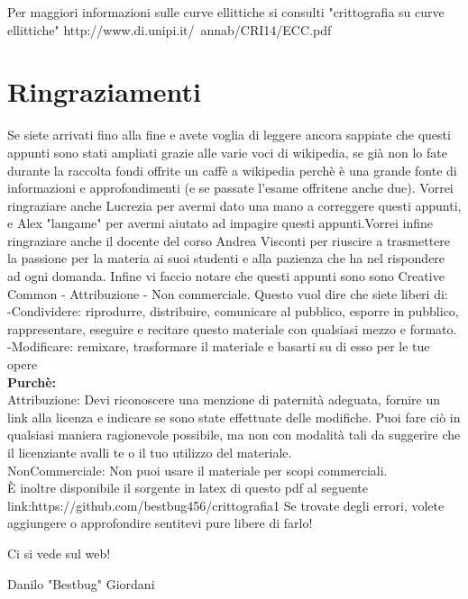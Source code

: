 \documentclass[10pt,a4paper]{article}
\begin{document}
Per maggiori informazioni sulle curve ellittiche si consulti "crittografia su curve ellittiche" http://www.di.unipi.it/~annab/CRI14/ECC.pdf

\section{Ringraziamenti}
Se siete arrivati fino alla fine e avete voglia di leggere ancora sappiate che questi appunti sono stati ampliati grazie alle varie voci di wikipedia, se già non lo fate durante la raccolta fondi offrite un caffè a wikipedia perchè è una grande fonte di informazioni e approfondimenti (e se passate l'esame offritene anche due). Vorrei ringraziare anche Lucrezia per avermi dato una mano a correggere questi appunti, e Alex "langame" per avermi aiutato ad impagire questi appunti.Vorrei infine ringraziare anche il docente del corso Andrea Visconti per riuscire a trasmettere la passione per la materia ai suoi studenti e alla pazienza che ha nel rispondere ad ogni domanda. Infine vi faccio notare che questi appunti sono sono Creative Common - Attribuzione - Non commerciale. Questo vuol dire che siete liberi di:\\
-Condividere: riprodurre, distribuire, comunicare al pubblico, esporre in pubblico, rappresentare, eseguire e recitare questo materiale con qualsiasi mezzo e formato.\\
-Modificare: remixare, trasformare il materiale e basarti su di esso per le tue opere \\
\textbf{Purchè:}\\
Attribuzione: Devi riconoscere una menzione di paternità adeguata, fornire un link alla licenza e indicare se sono state effettuate delle modifiche. Puoi fare ciò in qualsiasi maniera ragionevole possibile, ma non con modalità tali da suggerire che il licenziante avalli te o il tuo utilizzo del materiale. \\
NonCommerciale: Non puoi usare il materiale per scopi commerciali. \\

È inoltre disponibile il sorgente in latex di questo pdf al seguente link:https://github.com/bestbug456/crittografia1 Se trovate degli errori, volete aggiungere o approfondire sentitevi pure libere di farlo!

Ci si vede sul web!

Danilo "Bestbug" Giordani
\end{document}
